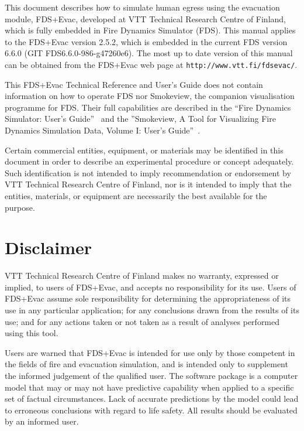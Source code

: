 \documentclass[12pt,a4paper,final,twoside]{stylevk}
\begin{document}
\noindent This document describes how to simulate human egress using
the evacuation module, FDS+Evac, developed at VTT Technical Research
Centre of Finland, which is fully embedded in Fire Dynamics Simulator
(FDS).  This manual applies to the FDS+Evac version 2.5.2, which is
embedded in the current FDS version 6.6.0 (GIT FDS6.6.0-986-g47260e6).
The most up to date version of this manual can be obtained from the
FDS+Evac web page at
\texttt{http://www.vtt.fi/}\linebreak[4]\texttt{fdsevac/}.


This FDS+Evac Technical Reference and User's Guide does not contain
information on how to operate FDS nor Smokeview, the companion
visualisation programme for FDS.  Their full capabilities are
described in the ``Fire Dynamics Simulator: User's
Guide''~\cite{FDS_UserGuide} and the ''Smokeview, A Tool for
Visualizing Fire Dynamics Simulation Data,  Volume I: User's
Guide''~\cite{SV_UserGuide}.


Certain commercial entities, equipment, or materials may be identified
in this document in order to describe an experimental procedure or
concept adequately.  Such identification is not intended to imply
recommendation or endorsement by VTT Technical Research Centre of
Finland, nor is it intended to imply that the entities, materials, or
equipment are necessarily the best available for the purpose.


\newpage


\chapter*{Disclaimer}

\noindent VTT Technical Research Centre of Finland makes no warranty,
expressed or implied, to users of FDS+Evac, and accepts no
responsibility for its use.  Users of FDS+Evac assume sole
responsibility for determining the appropriateness of its use in any
particular application; for any conclusions drawn from the results of
its use; and for any actions taken or not taken as a result of
analyses performed using this tool.


Users are warned that FDS+Evac is intended for use only by those
competent in the fields of fire and evacuation simulation, and is
intended only to supplement the informed judgement of the qualified
user.  The software package is a computer model that may or may not
have predictive capability when applied to a specific set of factual
circumstances.  Lack of accurate predictions by the model could lead
to erroneous conclusions with regard to life safety.  All results
should be evaluated by an informed user.
\end{document}

